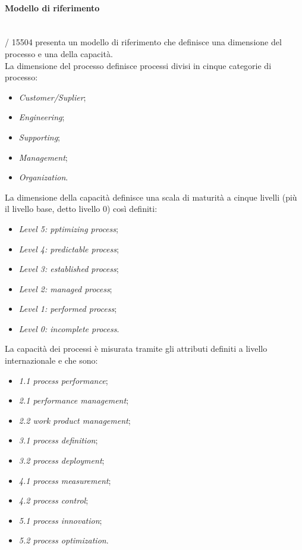   \paragraph{Modello di riferimento}\\
  / 15504 presenta un modello di riferimento che definisce una dimensione del processo e una della capacità.\\
  La dimensione del processo definisce processi divisi in cinque categorie di processo:
  \begin{itemize}
    \item \emph{Customer/Suplier};
    \item \emph{Engineering};
    \item \emph{Supporting};
    \item \emph{Management};
    \item \emph{Organization}.
  \end{itemize}
  La dimensione della capacità definisce una scala di maturità a cinque livelli (più il livello base, detto livello 0) così definiti:
  \begin{itemize}
    \item \emph{Level 5: pptimizing process};
    \item \emph{Level 4: predictable process};
    \item \emph{Level 3: established process};
    \item \emph{Level 2: managed process};
    \item \emph{Level 1: performed process};
    \item \emph{Level 0: incomplete process}.
  \end{itemize}
  La capacità dei processi è misurata tramite gli attributi definiti a livello internazionale e che sono:
  \begin{itemize}
    \item \emph{1.1 process performance};
    \item \emph{2.1 performance management};
    \item \emph{2.2 work product management};
    \item \emph{3.1 process definition};
    \item \emph{3.2 process deployment};
    \item \emph{4.1 process measurement};
    \item \emph{4.2 process control};
    \item \emph{5.1 process innovation};
    \item \emph{5.2 process optimization}.
  \end{itemize}

